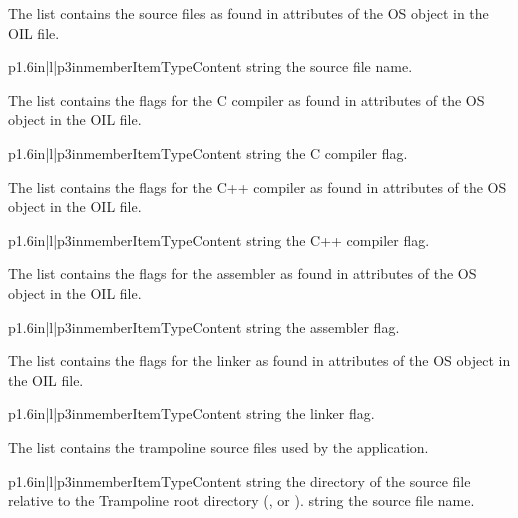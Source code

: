 The  list contains the source files as found in attributes  of the OS object in the OIL file.

\begin{longtableiii}{p{1.6in}|l|p{3in}}{member}{Item}{Type}{Content}
  {string}
  {the source file name.}
\end{longtableiii}

The  list contains the flags for the C compiler as found in attributes  of the OS object in the OIL file.

\begin{longtableiii}{p{1.6in}|l|p{3in}}{member}{Item}{Type}{Content}
  {string}
  {the C compiler flag.}
\end{longtableiii}

The  list contains the flags for the C++ compiler as found in attributes  of the OS object in the OIL file.

\begin{longtableiii}{p{1.6in}|l|p{3in}}{member}{Item}{Type}{Content}
  {string}
  {the C++ compiler flag.}
\end{longtableiii}

The  list contains the flags for the assembler as found in attributes  of the OS object in the OIL file.

\begin{longtableiii}{p{1.6in}|l|p{3in}}{member}{Item}{Type}{Content}
  {string}
  {the assembler flag.}
\end{longtableiii}

The  list contains the flags for the linker as found in attributes  of the OS object in the OIL file.

\begin{longtableiii}{p{1.6in}|l|p{3in}}{member}{Item}{Type}{Content}
  {string}
  {the linker flag.}
\end{longtableiii}

The  list contains the trampoline source files used by the application.

\begin{longtableiii}{p{1.6in}|l|p{3in}}{member}{Item}{Type}{Content}
  {string}
  {the directory of the source file relative to the Trampoline root directory (,  or ).}
  {string}
  {the source file name.}
\end{longtableiii}


